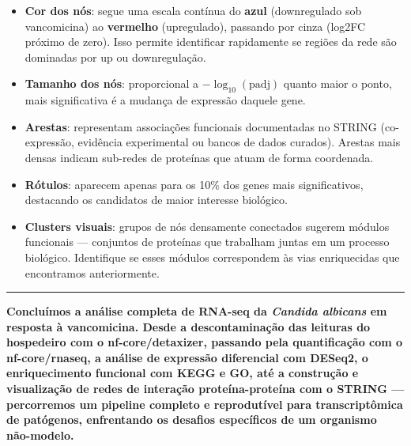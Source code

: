 \documentclass[
  letterpaper,
  DIV=11,
  numbers=noendperiod]{scrreprt}
\providecommand{\tightlist}{%
  \setlength{\itemsep}{0pt}\setlength{\parskip}{0pt}}
\begin{document}
\begin{itemize}
\tightlist
\item
  \textbf{Cor dos nós}: segue uma escala contínua do \textbf{azul}
  (downregulado sob vancomicina) ao \textbf{vermelho} (upregulado),
  passando por cinza (log2FC próximo de zero). Isso permite identificar
  rapidamente se regiões da rede são dominadas por up ou downregulação.
\item
  \textbf{Tamanho dos nós}: proporcional a \(-\log_{10}(\text{padj})\)
  quanto maior o ponto, mais significativa é a mudança de expressão
  daquele gene.
\item
  \textbf{Arestas}: representam associações funcionais documentadas no
  STRING (co-expressão, evidência experimental ou bancos de dados
  curados). Arestas mais densas indicam sub-redes de proteínas que atuam
  de forma coordenada.
\item
  \textbf{Rótulos}: aparecem apenas para os 10\% dos genes mais
  significativos, destacando os candidatos de maior interesse biológico.
\item
  \textbf{Clusters visuais}: grupos de nós densamente conectados sugerem
  módulos funcionais --- conjuntos de proteínas que trabalham juntas em
  um processo biológico. Identifique se esses módulos correspondem às
  vias enriquecidas que encontramos anteriormente.
\end{itemize}

\begin{center}\rule{0.5\linewidth}{0.5pt}\end{center}

\textbf{Concluímos a análise completa de RNA-seq da \emph{Candida
albicans} em resposta à vancomicina. Desde a descontaminação das
leituras do hospedeiro com o nf-core/detaxizer, passando pela
quantificação com o nf-core/rnaseq, a análise de expressão diferencial
com DESeq2, o enriquecimento funcional com KEGG e GO, até a construção e
visualização de redes de interação proteína-proteína com o STRING ---
percorremos um pipeline completo e reprodutível para transcriptômica de
patógenos, enfrentando os desafios específicos de um organismo
não-modelo.}
\end{document}
